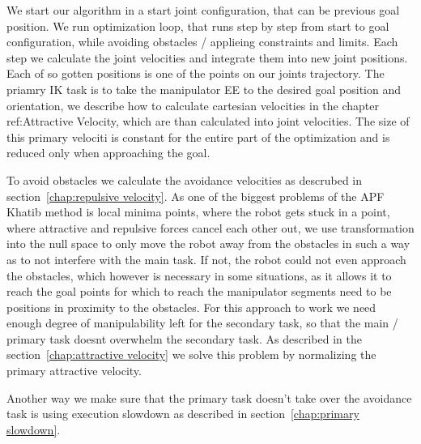 \documentclass[]{article}
\begin{document}

We start our algorithm in a start joint configuration, that can be previous goal position. We run optimization loop, that runs step by step from start to goal configuration, while avoiding obstacles / applieing constraints and limits. Each step we calculate the joint velocities and integrate them into new joint positions. Each of so gotten positions is one of the points on our joints trajectory. The priamry IK task is to take the manipulator EE to the desired goal position and orientation, we describe how to calculate cartesian velocities in the chapter ref:Attractive Velocity, which are than calculated into joint velocities. The size of this primary velociti is constant for the entire part of the optimization and is reduced only when approaching the goal. 

To avoid obstacles we calculate the avoidance velocities as descrubed in section~\ref{chap:repulsive velocity}. As one of the biggest problems of the APF Khatib method is local minima points, where the robot gets stuck in a point, where attractive and repulsive forces cancel each other out, we use transformation into the null space  to only move the robot away from the obstacles in such a way as to not interfere with the main task. If not, the robot could not even approach the obstacles, which however is necessary in some situations, as it allows it to reach the goal points for which to reach the manipulator segments need to be positions in proximity to the obstacles. For this approach to work we need enough degree of manipulability left for the secondary task, so that the main / primary task doesnt overwhelm the secondary task. As described in the section~\ref{chap:attractive velocity} we solve this problem by normalizing the primary attractive velocity. 


Another way we make sure that the primary task doesn't take over the avoidance task is using execution slowdown as described in section~\ref{chap:primary slowdown}.


\end{document}
